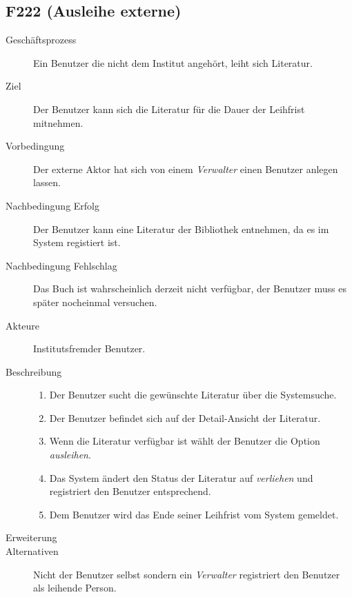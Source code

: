 \subsection{F222 (Ausleihe externe)}
\begin{description}
  \item[Geschäftsprozess]Ein Benutzer die nicht dem Institut angehört, leiht sich Literatur.
  \item[Ziel]Der Benutzer kann sich die Literatur für die Dauer der Leihfrist mitnehmen.
  \item[Vorbedingung]Der externe Aktor hat sich von einem \emph{Verwalter} einen Benutzer anlegen lassen.
  \item[Nachbedingung Erfolg]Der Benutzer kann eine Literatur der Bibliothek entnehmen, da es im System registiert ist.
  \item[Nachbedingung Fehlschlag]Das Buch ist wahrscheinlich derzeit nicht verfügbar, der Benutzer muss es später nocheinmal versuchen.
  \item[Akteure]Institutsfremder Benutzer.
  \item[Beschreibung]
    \begin{enumerate}
      \item Der Benutzer sucht die gewünschte Literatur über die Systemsuche.
      \item Der Benutzer befindet sich auf der Detail-Ansicht der Literatur.
      \item Wenn die Literatur verfügbar ist wählt der Benutzer die Option \emph{ausleihen}.
      \item Das System ändert den Status der Literatur auf \emph{verliehen} und registriert den Benutzer entsprechend.
      \item Dem Benutzer wird das Ende seiner Leihfrist vom System gemeldet.
    \end{enumerate}
  \item[Erweiterung]
  \item[Alternativen]Nicht der Benutzer selbst sondern ein \emph{Verwalter} registriert den Benutzer als leihende Person.
\end{description}

